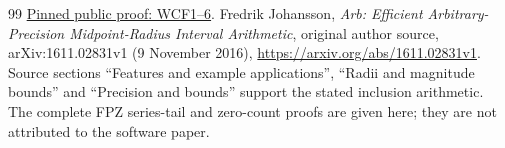 \documentclass[11pt]{article}
\begin{document}
\begin{thebibliography}{99}
\href{https://github.com/KokunoYumeto/zeta-function-research-reader/blob/5992ad50c0f2a06921f1fcaded7b4e38097c0739/workbenches/splitzero-tandem/continuations/20260920-original-kernel-mixed-determinants/providers/WEIGHTED_CONDUCTOR_FORWARD.tex#L28}{Pinned public proof: WCF1--6}.
 Fredrik Johansson,
\emph{Arb: Efficient Arbitrary-Precision Midpoint-Radius Interval Arithmetic},
original author source, arXiv:1611.02831v1 (9 November 2016),
\url{https://arxiv.org/abs/1611.02831v1}.
Source sections ``Features and example applications'', ``Radii and
magnitude bounds'' and ``Precision and bounds'' support the stated
inclusion arithmetic. The complete FPZ series-tail and zero-count proofs
are given here; they are not attributed to the software paper.
\end{thebibliography}
\end{document}
